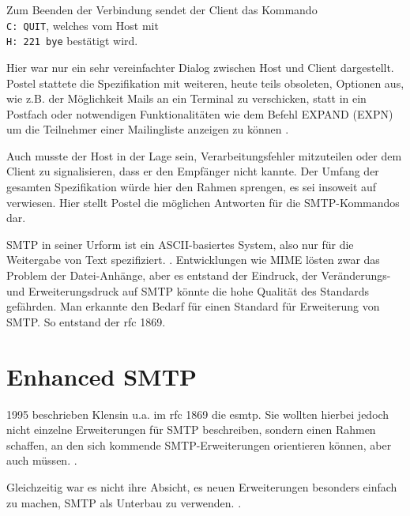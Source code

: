 Zum Beenden der Verbindung sendet der Client das Kommando \\
\verb+C: QUIT+, welches vom Host mit \\
\verb+H: 221 bye+ bestätigt wird. 

Hier war nur ein sehr vereinfachter Dialog zwischen Host und Client dargestellt. Postel stattete die Spezifikation mit weiteren, heute teils obsoleten, Optionen aus, wie z.B. der Möglichkeit Mails an ein Terminal zu verschicken, statt in ein Postfach \citep[vgl.][11]{rfc821} oder notwendigen Funktionalitäten wie dem Befehl EXPAND (EXPN) um die Teilnehmer einer Mailingliste anzeigen zu können \citep[vgl.][8]{rfc821}.

Auch musste der Host in der Lage sein, Verarbeitungsfehler mitzuteilen oder dem Client zu signalisieren, dass er den Empfänger nicht kannte. Der Umfang der gesamten Spezifikation würde hier den Rahmen sprengen, es sei insoweit auf \cite[][S. 37 ff.]{rfc821} verwiesen. Hier stellt Postel die möglichen Antworten für die SMTP-Kommandos dar.

SMTP in seiner Urform ist ein ASCII-basiertes System, also nur für die Weitergabe von Text spezifiziert. \citep[][21]{rfc821}. Entwicklungen wie MIME \citep[vgl.][]{rfc1521} lösten zwar das Problem der Datei-Anhänge, aber es entstand der Eindruck, der Veränderungs- und Erweiterungsdruck auf SMTP könnte die hohe Qualität des Standards gefährden. Man erkannte den Bedarf für einen Standard für Erweiterung von SMTP. So entstand der \ac{rfc} 1869.

\section{Enhanced SMTP}

1995 beschrieben Klensin u.a. im \ac{rfc} 1869 die \ac{esmtp}.
Sie wollten hierbei jedoch nicht einzelne Erweiterungen für SMTP beschreiben, sondern einen Rahmen schaffen, an den sich kommende SMTP-Erweiterungen orientieren können, aber auch müssen.  \citep[][1]{rfc1869}. 

Gleichzeitig war es nicht ihre Absicht, es neuen Erweiterungen besonders einfach zu machen, SMTP als Unterbau zu verwenden.  \citep[][2]{rfc1869}. 

